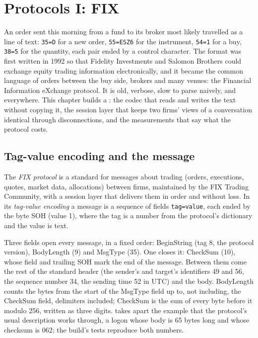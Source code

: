 \chapter{Protocols I: FIX}\label{ch:ll:protocols-i-fix}

An order sent this morning from a fund to its broker most likely travelled as a line of text: \texttt{35=D} for a new
order, \texttt{55=ESZ6} for the instrument, \texttt{54=1} for a buy, \texttt{38=5} for the quantity, each pair ended by a
control character. The format was first written in 1992 so that Fidelity Investments and Salomon Brothers could exchange
equity trading information electronically, and it became the common language of orders between the buy side, brokers and
many venues: the Financial Information eXchange protocol. It is old, verbose, slow to parse naively, and everywhere. This
chapter builds a : the codec that reads and writes the text without copying it, the session layer that keeps two
firms' views of a conversation identical through disconnections, and the measurements that say what the protocol costs.

\section{Tag-value encoding and the message}

\begin{definition}\label{def:ll:protocols-i-fix:fix}
The \emph{FIX protocol} is a standard for messages about trading (orders, executions, quotes, market
data, allocations) between firms, maintained by the FIX Trading Community, with a session layer that delivers them in order
and without loss. In its \emph{tag-value encoding} a message is a sequence of fields
\texttt{tag=value}, each ended by the byte SOH (value 1), where the tag is a number from the protocol's dictionary and the
value is text.
\end{definition}

Three fields open every message, in a fixed order: BeginString (tag 8, the protocol version), BodyLength (9) and MsgType (35).
One closes it: CheckSum (10), whose field and trailing SOH mark the end of the message. Between them come the rest of the
standard header (the sender's and target's identifiers 49 and 56, the sequence number 34, the sending time 52 in UTC) and the
body. BodyLength counts the bytes from the start of the MsgType field up to, not including, the CheckSum field, delimiters
included; CheckSum is the sum of every byte before it modulo 256, written as three digits.
 takes apart the example that the protocol's usual description works through, a logon
whose body is 65 bytes long and whose checksum is 062; the build's tests reproduce both numbers.

